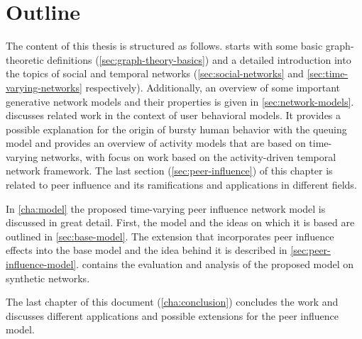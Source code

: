 

\section{Outline}
\label{sec:outline}

The content of this thesis is structured as follows.
 starts with some basic graph-theoretic definitions (\cref{sec:graph-theory-basics}) and a detailed introduction into the topics of social and temporal networks (\cref{sec:social-networks} and \cref{sec:time-varying-networks} respectively).
Additionally, an overview of some important generative network models and their properties is given in \cref{sec:network-models}.
 discusses related work in the context of user behavioral models.
It provides a possible explanation for the origin of bursty human behavior with the queuing model and provides an overview of activity models that are based on time-varying networks, with focus on work based on the activity-driven temporal network framework.
The last section (\cref{sec:peer-influence}) of this chapter is related to peer influence and its ramifications and applications in different fields.

In \cref{cha:model} the proposed time-varying peer influence network model is discussed in great detail.
First, the model and the ideas on which it is based are outlined in \cref{sec:base-model}.
The extension that incorporates peer influence effects into the base model and the idea behind it is described in \cref{sec:peer-influence-model}.
 contains the evaluation and analysis of the proposed model on synthetic networks.

The last chapter of this document (\cref{cha:conclusion}) concludes the work and discusses different applications and possible extensions for the peer influence model.
